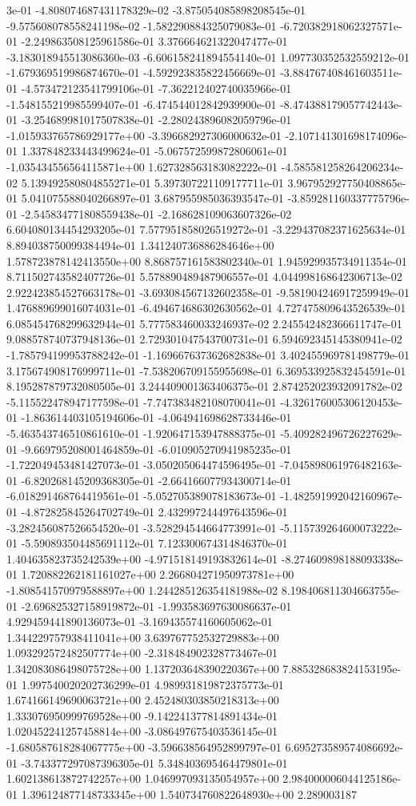 3e-01	-4.808074687431178329e-02	-3.875054085898208545e-01	-9.575608078558241198e-02	-1.582290884325079083e-01	-6.720382918062327571e-01	-2.249863508125961586e-01	3.376664621322047477e-01	-3.183018945513086360e-03	-6.606158241894554140e-01	1.097730352532559212e-01	-1.679369519986874670e-01	-4.592923835822456669e-01	-3.884767408461603511e-01	-4.573472123541799106e-01	-7.362212402740035966e-01	-1.548155219985599407e-01	-6.474544012842939900e-01	-8.474388179057742443e-01	-3.254689981017507838e-01	-2.280243896082059796e-01	-1.015933765786929177e+00	-3.396682927306000632e-01	-2.107141301698174096e-01	1.337848233443499624e-01	-5.067572599872806061e-01	-1.035434556564115871e+00	1.627328563183082222e-01	-4.585581258264206234e-02	5.139492580804855271e-01	5.397307221109177711e-01	3.967952927750408865e-01	5.041075588040266897e-01	3.687955985036393547e-01	-3.859281160337775796e-01	-2.545834771808559438e-01	-2.168628109063607326e-02	6.604080134454293205e-01	7.577951858026519272e-01	-3.229437082371625634e-01	8.894038750099384494e-01	1.341240736886284646e+00	1.578723878142413550e+00	8.868757161583802340e-01	1.945929935734911354e-01	8.711502743582407726e-01	5.578890489487906557e-01	4.044998168642306713e-02	2.922423854527663178e-01	-3.693084567132602358e-01	-9.581904246917259949e-01	1.476889699016074031e-01	-6.494674686302630562e-01	4.727475809643526539e-01	6.085454768299632944e-01	5.777583460033246937e-02	2.245542482366611747e-01	9.088578740737948136e-01	2.729301047543700731e-01	6.594692345145380941e-02	-1.785794199953788242e-01	-1.169667637362682838e-01	3.402455969781498779e-01	3.175674908176999711e-01	-7.538206709155955698e-01	6.369533925832454591e-01	8.195287879732080505e-01	3.244409001363406375e-01	2.874252023932091782e-02	-5.115522478947177598e-01	-7.747383482108070041e-01	-4.326176005306120453e-01	-1.863614403105194606e-01	-4.064941698628733446e-01	-5.463543746510861610e-01	-1.920647153947888375e-01	-5.409282496726227629e-01	-9.669795208001464859e-01	-6.010905270941985235e-01	-1.722049453481427073e-01	-3.050205064474596495e-01	-7.045898061976482163e-01	-6.820268145209368305e-01	-2.664166077934300714e-01	-6.018291468764419561e-01	-5.052705389078183673e-01	-1.482591992042160967e-01	-4.872825845264702749e-01	2.432997244497643596e-01	-3.282456087526654520e-01	-3.528294544664773991e-01	-5.115739264600073222e-01	-5.590893504485691112e-01	7.123300674314846370e-01	1.404635823735242539e+00	-4.971518149193832614e-01	-8.274609898188093338e-01	1.720882262181161027e+00	2.266804271950973781e+00	-1.808541570979588897e+00	1.244285126354181988e-02	8.198406811304663755e-01	-2.696825327158919872e-01	-1.993583697630086637e-01	4.929459441890136073e-01	-3.169435574160605062e-01	1.344229757938411041e+00	3.639767752532729883e+00	1.093292572482507774e+00	-2.318484902328773467e-01	1.342083086498075728e+00	1.137203648390220367e+00	7.885328683824153195e-01	1.997540020202736299e-01	4.989931819872375773e-01	1.674166149690063721e+00	2.452480303850218313e+00	1.333076950999769528e+00	-9.142241377814891434e-01	1.020452241257458814e+00	-3.086497675403536145e-01	-1.680587618284067775e+00	-3.596638564952899797e-01	6.695273589574086692e-01	-3.743377297087396305e-01	5.348403695464479801e-01	1.602138613872742257e+00	1.046997093135054957e+00	2.984000006044125186e-01	1.396124877148733345e+00	1.540734760822648930e+00	2.289003187